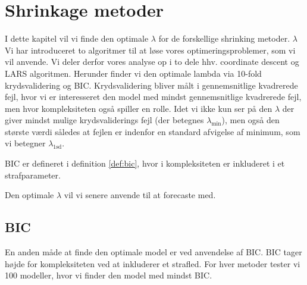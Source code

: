 \chapter{Shrinkage metoder}
I dette kapitel vil vi finde den optimale $\lambda$ for de forskellige shrinking metoder. 
 $\lambda$ 
Vi har introduceret to algoritmer til at løse vores optimeringsproblemer, som vi vil anvende.
Vi deler derfor vores analyse op i to dele  hhv. coordinate descent og LARS algoritmen.
Herunder finder vi den optimale lambda via 10-fold krydsvalidering og BIC. 
Krydsvalidering bliver målt  i gennemsnitlige kvadrerede fejl, hvor vi er interesseret den model med mindst gennemsnitlige kvadrerede fejl, men hvor kompleksiteten også spiller en rolle.
Idet vi ikke kun ser på den $\lambda$ der giver mindst mulige krydsvaliderings fejl (der betegnes $\lambda_{\min}$), men også den største værdi således at fejlen er indenfor en standard afvigelse af minimum, som vi betegner $\lambda_{\text{1sd}}$.  

BIC er defineret i definition \ref{def:bic}, hvor i kompleksiteten er inkluderet i et strafparameter. 

Den optimale $\lambda$ vil vi senere anvende til at forecaste med. 




\section{BIC}
En anden måde at finde den optimale model er ved anvendelse af BIC. 
BIC tager højde for kompleksiteten ved at inkluderer et strafled.
For hver metoder tester vi 100 modeller, hvor vi finder den model med mindst BIC. 


\
